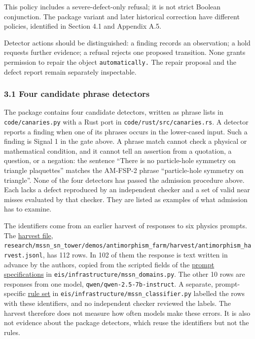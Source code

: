\documentclass[
  11pt,
]{article}
\begin{document}
This policy includes a severe-defect-only refusal; it is not strict
Boolean conjunction. The package variant and later historical correction
have different policies, identified in Section 4.1 and Appendix A.5.

Detector actions should be distinguished: a finding records an
observation; a hold requests further evidence; a refusal rejects one
proposed transition. None grants permission to repair the object
\nolinkurl{automatically.} The repair proposal and the defect report
remain separately inspectable.

\subsubsection{3.1 Four candidate phrase
detectors}\label{four-candidate-phrase-detectors}

The package contains four candidate detectors, written as phrase lists
in \nolinkurl{code/canaries.py} with a Rust port in
\nolinkurl{code/rust/src/canaries.rs}. A detector reports a finding when
one of its phrases occurs in the lower-cased input. Such a finding is
Signal 1 in the gate above. A phrase match cannot check a physical or
mathematical condition, and it cannot tell an assertion from a
quotation, a question, or a negation: the sentence ``There is no
particle-hole symmetry on triangle plaquettes'' matches the AM-FSP-2
phrase ``particle-hole symmetry on triangle''. None of the four
detectors has passed the admission procedure above. Each lacks a defect
reproduced by an independent checker and a set of valid near misses
evaluated by that checker. They are listed as examples of what admission
has to examine.

The identifiers come from an earlier harvest of responses to six physics
prompts. The
\href{https://github.com/dbccpage/the_symbol_game/blob/52cb5457f6c485ba548cfd292f6012a941ed22cf/research/mssn_sn_tower/demos/antimorphism_farm/harvest/antimorphism_harvest.jsonl}{harvest
file},
\nolinkurl{research/mssn_sn_tower/demos/antimorphism_farm/harvest/antimorphism_harvest.jsonl},
has 112 rows. In 102 of them the response is text written in advance by
the authors, copied from the scripted fields of the
\href{https://github.com/dbccpage/the_symbol_game/blob/52cb5457f6c485ba548cfd292f6012a941ed22cf/eis/infrastructure/mssn_domains.py}{prompt
specifications} in
\nolinkurl{eis/infrastructure/mssn_domains.py}.
The other 10 rows are responses from one model,
\nolinkurl{qwen/qwen-2.5-7b-instruct}. A separate, prompt-specific
\href{https://github.com/dbccpage/the_symbol_game/blob/52cb5457f6c485ba548cfd292f6012a941ed22cf/eis/infrastructure/mssn_classifier.py}{rule
set} in
\nolinkurl{eis/infrastructure/mssn_classifier.py}
labelled the rows with these identifiers, and no independent checker
reviewed the labels. The harvest therefore does not measure how often
models make these errors. It is also not evidence about the package
detectors, which reuse the identifiers but not the rules.
\end{document}
